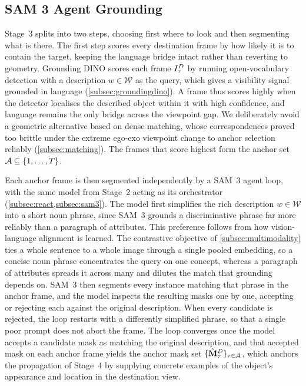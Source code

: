 \subsection{SAM 3 Agent Grounding}
\label{subsec:Stage3}

Stage~3 splits into two steps, choosing first where to look and then segmenting what is there. The first step scores every destination frame by how likely it is to contain the target, keeping the language bridge intact rather than reverting to geometry. Grounding DINO scores each frame $I^D_\tau$ by running open-vocabulary detection with a description $w \in \mathcal{W}$ as the query, which gives a visibility signal grounded in language (\cref{subsec:groundingdino}). A frame thus scores highly when the detector localises the described object within it with high confidence, and language remains the only bridge across the viewpoint gap. We deliberately avoid a geometric alternative based on dense matching, whose correspondences proved too brittle under the extreme ego-exo viewpoint change to anchor selection reliably (\cref{subsec:matching}). The frames that score highest form the anchor set $\mathcal{A} \subseteq \{1, \ldots, T\}$.

Each anchor frame is then segmented independently by a SAM~3 agent loop, with the same model from Stage~2 acting as its orchestrator (\cref{subsec:react,subsec:sam3}). The model first simplifies the rich description $w \in \mathcal{W}$ into a short noun phrase, since SAM~3 grounds a discriminative phrase far more reliably than a paragraph of attributes. This preference follows from how vision-language alignment is learned. The contrastive objective of \cref{subsec:multimodality} ties a whole sentence to a whole image through a single pooled embedding, so a concise noun phrase concentrates the query on one concept, whereas a paragraph of attributes spreads it across many and dilutes the match that grounding depends on. SAM~3 then segments every instance matching that phrase in the anchor frame, and the model inspects the resulting masks one by one, accepting or rejecting each against the original description. When every candidate is rejected, the loop restarts with a differently simplified phrase, so that a single poor prompt does not abort the frame. The loop converges once the model accepts a candidate mask as matching the original description, and that accepted mask on each anchor frame yields the anchor mask set $\{\hat{\mathbf{M}}^D_\tau\}_{\tau \in \mathcal{A}}$, which anchors the propagation of Stage~4 by supplying concrete examples of the object's appearance and location in the destination view.


